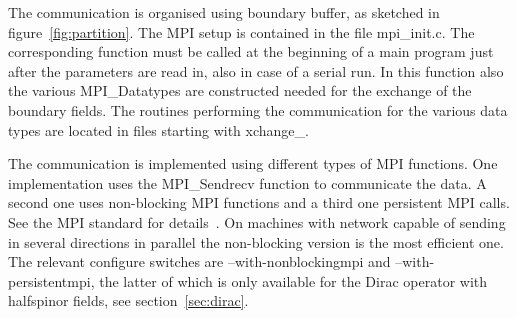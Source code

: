 The communication is organised using boundary buffer, as sketched in
figure~\ref{fig:partition}. 
%
The MPI setup is contained in the file {\ttfamily mpi\_init.c}. The
corresponding function must be called at the beginning of a main
program just after the parameters are read in, also in case of a
serial run. In this function also 
the various {\ttfamily MPI\_Datatype}s are constructed needed for the
exchange of the boundary fields. The routines performing the
communication for the various data types are located in files starting
with {\ttfamily xchange\_}.

The communication is implemented using different types of MPI
functions. One implementation uses the {\ttfamily MPI\_Sendrecv}
function to communicate the data. A second one uses non-blocking MPI
functions and a third one persistent MPI calls. See the MPI standard
for details~\cite{mpi:web}. On machines with network capable of
sending in several directions in parallel the non-blocking version is
the most efficient one. The relevant configure switches are {\ttfamily
  --with-nonblockingmpi} and {\ttfamily --with-persistentmpi}, the
latter of which is only available for the Dirac operator with
halfspinor fields, see section~\ref{sec:dirac}.


